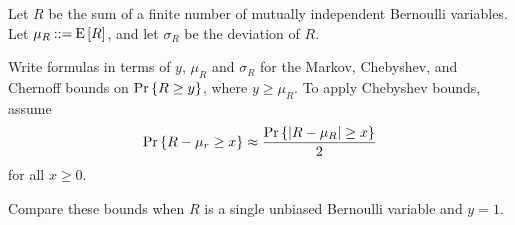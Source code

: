 \documentclass[10pt]{article}
\begin{document}
%

\begin{problem} 
Let $R$ be the sum of a finite number of mutually independent Bernoulli
variables.  Let $\mu_R \mathbin{::=} \mathop{\textup{E}}\nolimits\left[R\right]$, and let $\sigma_R$ be the
deviation of $R$.

\begin{problemparts}

\problempart Write formulas in terms of $y$, $\mu_R$ and $\sigma_R$ for
the Markov, Chebyshev, and Chernoff bounds on $\mathop{\textup{Pr}}\nolimits\left\{R \geq y\right\}$, where $y
\geq \mu_R$.  \hint To apply Chebyshev bounds, assume
\begin{equation}\label{C/2}
\mathop{\textup{Pr}}\nolimits\left\{R-\mu_r \geq x\right\} \approx \frac{\mathop{\textup{Pr}}\nolimits\left\{\left|R - \mu_R\right| \geq x\right\}}{2}
\end{equation}
for all $x \geq 0$.


\problempart  Compare these bounds when $R$ is a single unbiased Bernoulli
variable and $y=1$.

\end{problemparts}
\end{problem}
\end{document}
